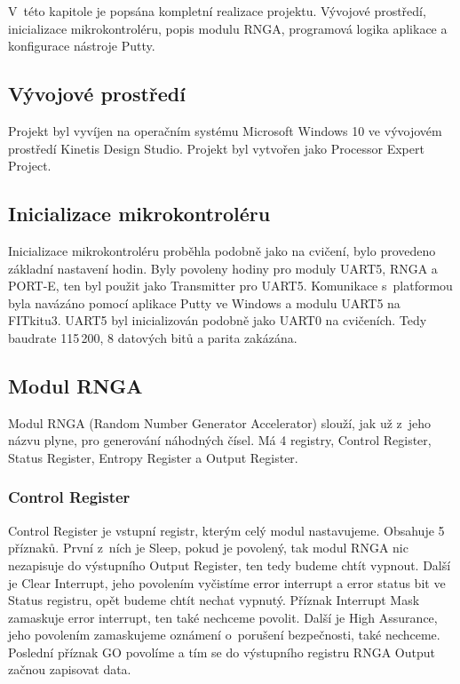 \documentclass[11pt, a4paper, titlepage]{article}
\begin{document}
V~této kapitole je popsána kompletní realizace projektu. Vývojové prostředí,  inicializace mikrokontroléru, popis modulu RNGA, programová logika aplikace a konfigurace nástroje Putty.


\subsection{Vývojové prostředí}

Projekt byl vyvíjen na operačním systému Microsoft Windows 10 ve vývojovém prostředí Kinetis Design Studio. Projekt byl vytvořen jako Processor Expert Project. \cite{NXP-IDE}


\subsection{Inicializace mikrokontroléru}

Inicializace mikrokontroléru proběhla podobně jako na cvičení, bylo provedeno základní nastavení hodin. Byly povoleny hodiny pro moduly UART5, RNGA a PORT-E, ten byl použit jako Transmitter pro UART5. Komunikace s~platformou byla navázáno pomocí aplikace Putty ve Windows a modulu UART5 na FITkitu3. UART5 byl inicializován podobně jako UART0 na cvičeních. Tedy baudrate 115\,200, 8 datových bitů a parita zakázána. \cite{IMP}


\subsection{Modul RNGA}

Modul RNGA (Random Number Generator Accelerator) slouží, jak už z~jeho názvu plyne, pro generování náhodných čísel. Má 4 registry, Control Register, Status Register, Entropy Register a Output Register. \cite{NXP-K60}


\subsubsection{Control Register}

Control Register je vstupní registr, kterým celý modul nastavujeme. Obsahuje 5 příznaků. První z~ních je Sleep, pokud je povolený, tak modul RNGA nic nezapisuje do výstupního Output Register, ten tedy budeme chtít vypnout. Další je Clear Interrupt, jeho povolením vyčistíme error interrupt a error status bit ve Status registru, opět budeme chtít nechat vypnutý. Příznak Interrupt Mask zamaskuje error interrupt, ten také nechceme povolit. Další je High Assurance, jeho povolením zamaskujeme oznámení o~porušení bezpečnosti, také nechceme. Poslední příznak GO povolíme a tím se do výstupního registru RNGA Output začnou zapisovat data.
\end{document}
